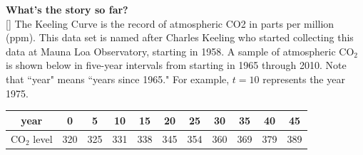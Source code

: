 \documentclass[10pt]{article}
\begin{document}
\newpage

{\bf What's the story so far?} \mod \\
[]{
The Keeling Curve is the record of atmospheric CO2 in parts per million (ppm). This data set is named after Charles Keeling who started collecting this data at Mauna Loa Observatory, starting in 1958.  A sample of atmospheric CO$_2$ is shown below in five-year intervals from starting in 1965 through 2010.  Note that ``year" means ``years since 1965."  For example, $t=10$ represents the year 1975.
}{
}

\begin{center}
\begin{tabular}{|c|c|c|c|c|c|c|c|c|c|c|}
\hline
year & 0 & 5 & 10 & 15 & 20 & 25 & 30 & 35 & 40 & 45 \\
\hline
CO$_2$ level & 320 & 325 & 331 & 338 & 345 & 354 & 360 & 369 & 379 & 389 \\
\hline
\end{tabular}
\end{center}
\end{document}
